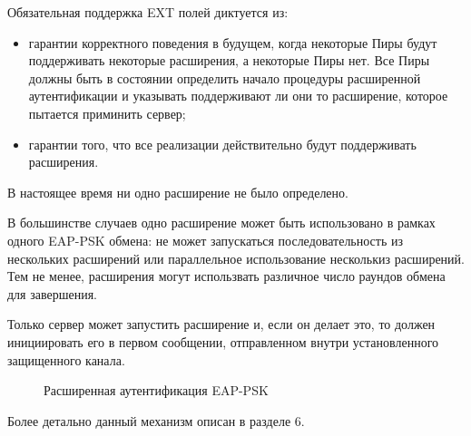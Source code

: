 Обязательная поддержка EXT полей диктуется из:

\begin{itemize}
\item гарантии корректного поведения в будущем, когда некоторые Пиры будут поддерживать некоторые расширения, а некоторые Пиры нет. Все Пиры должны быть в состоянии определить начало процедуры расширенной аутентификации и указывать поддерживают ли они то расширение, которое пытается приминить сервер;
\item гарантии того, что все реализации действительно будут поддерживать расширения.
\end{itemize}

В настоящее время ни одно расширение не было определено.

В большинстве случаев одно расширение может быть использовано в рамках одного EAP-PSK обмена: не может запускаться последовательность из нескольких расширений или параллельное использование несколькиз расширений. Тем не менее, расширения могут использвать различное число раундов обмена для завершения.

Только сервер может запустить расширение и, если он делает это, то должен инициировать его в первом сообщении, отправленном внутри установленного защищенного канала.

\begin{figure}[h!]
\caption{Расширенная аутентификация EAP-PSK}
\label{img:extended_aut}
\end{figure}

Более детально данный механизм описан в разделе 6.

